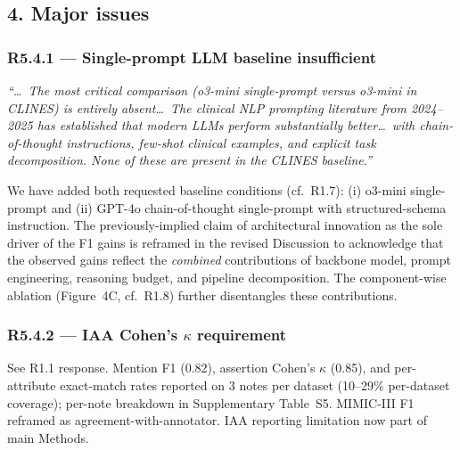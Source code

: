\documentclass[11pt,letterpaper]{article}
\newcommand{\reviewer}[1]{\par\medskip\textcolor{blue!75!black}{\textit{#1}}\par\medskip}
\newcommand{\response}[1]{\par#1\par\medskip}
\begin{document}
\subsection*{4. Major issues}

\subsubsection*{R5.4.1 --- Single-prompt LLM baseline insufficient}
\reviewer{``\dots\ The most critical comparison (o3-mini single-prompt versus o3-mini in CLINES) is entirely absent\dots\ The clinical NLP prompting literature from 2024–2025 has established that modern LLMs perform substantially better\dots\ with chain-of-thought instructions, few-shot clinical examples, and explicit task decomposition. None of these are present in the CLINES baseline.''}
\response{We have added both requested baseline conditions (cf.\ R1.7): (i) o3-mini single-prompt and (ii) GPT-4o chain-of-thought single-prompt with structured-schema instruction. The previously-implied claim of architectural innovation as the sole driver of the F1 gains is reframed in the revised Discussion to acknowledge that the observed gains reflect the \emph{combined} contributions of backbone model, prompt engineering, reasoning budget, and pipeline decomposition. The component-wise ablation (Figure~4C, cf.\ R1.8) further disentangles these contributions.}

\subsubsection*{R5.4.2 --- IAA Cohen's $\kappa$ requirement}
\response{See R1.1 response. Mention F1 (0.82), assertion Cohen's $\kappa$ (0.85), and per-attribute exact-match rates reported on 3 notes per dataset (10--29\% per-dataset coverage); per-note breakdown in Supplementary Table~S5. MIMIC-III F1 reframed as agreement-with-annotator. IAA reporting limitation now part of main Methods.}
\end{document}
